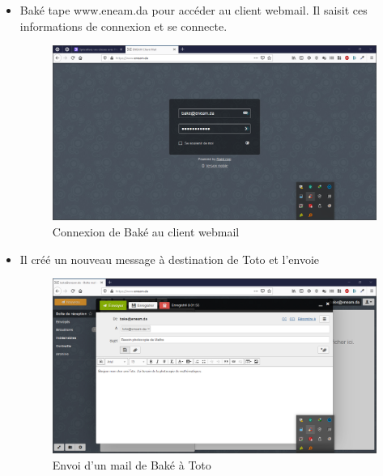 \documentclass[a4paper,12pt,french]{report} %
\begin{document}
\begin{itemize}
\item Baké tape www.eneam.da pour accéder au client webmail. Il saisit ces informations de connexion et se connecte.
\begin{figure}[H]
\centering
\includegraphics[scale=0.5]{figure/connexion_bake_large_screen.png}
\caption{Connexion de Baké au client webmail}
\end{figure} 
\item Il créé un nouveau message à destination de Toto et l'envoie
\begin{figure}[H]
\centering
\includegraphics[scale=0.5]{figure/bake_send_mail_to_toto1.png}
\caption{Envoi d'un mail de Baké à Toto}
\end{figure}


\end{itemize}
\end{document}
